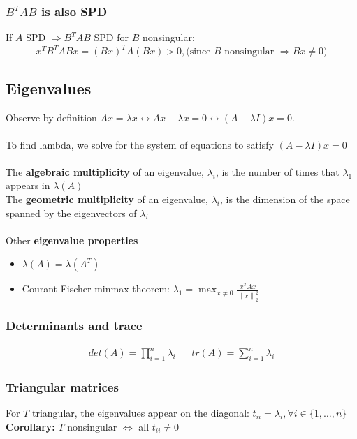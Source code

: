 \documentclass{article}
\newcommand{\norm}[2]{\left\lVert#1\right\rVert_#2}
\begin{document}
\subsubsection{$B^TAB$ is also SPD} 
If $A$ SPD $\Rightarrow B^TAB$ SPD for $B$ nonsingular:
\begin{equation*}
    x^TB^TABx = (Bx)^TA(Bx) > 0, \textrm{(since $B$ nonsingular $\Rightarrow Bx \neq 0$)}
\end{equation*}

\subsection{Eigenvalues}
Observe by definition $Ax= \lambda x \longleftrightarrow Ax - \lambda x = 0 \longleftrightarrow (A - \lambda I)x = 0$.\\ \\ 
To find lambda, we solve for the system of equations to satisfy $(A - \lambda I)x = 0$\\ \\
The \textbf{algebraic multiplicity} of an eigenvalue, $\lambda_i$, is the number of times that $\lambda_1$ appears in $\lambda(A)$\\
The \textbf{geometric multiplicity} of an eigenvalue, $\lambda_i$, is the dimension of the space spanned by the eigenvectors of $\lambda_i$\\ \\
Other \textbf{eigenvalue properties}
\begin{itemize}
    \item $\lambda(A) = \lambda(A^T)$
    \item Courant-Fischer minmax theorem: $\lambda_1 = \max_{x \neq 0}\frac{x^TAx}{\norm{x}{2}^2}$
\end{itemize}

\subsubsection{Determinants and trace}
\begin{align*}
    det(A) = \prod_{i=1}^n \lambda_i & & tr(A) = \sum_{i=1}^n \lambda_i
\end{align*}


\subsubsection{Triangular matrices}
For $T$ triangular, the eigenvalues appear on the diagonal: $t_{ii} = \lambda_i, \forall i \in \{1,\dots, n\}$\\
\textbf{Corollary:} $T$ nonsingular $\Leftrightarrow$ all $t_{ii} \neq 0$
\end{document}
